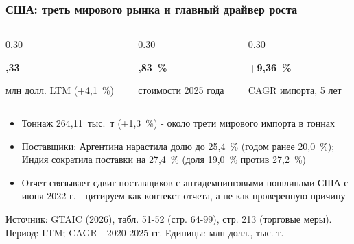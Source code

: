 \documentclass{beamer}
\begin{document}
\begin{frame}[t]
  \frametitle{США: треть мирового рынка и главный драйвер роста}
  \begin{columns}[t]
    \begin{column}{0.30\textwidth}
      {\color{accblue}\bfseries\fontsize{20}{24},33\par}
      {\scriptsize\color{black!60} млн долл. LTM (+4,1~\%)\par}
    \end{column}
    \begin{column}{0.30\textwidth}
      {\color{accblue}\bfseries\fontsize{20}{24},83~\%\par}
      {\scriptsize\color{black!60} стоимости 2025 года\par}
    \end{column}
    \begin{column}{0.30\textwidth}
      {\color{accblue}\bfseries\fontsize{20}{24}\selectfont +9,36~\%\par}
      {\scriptsize\color{black!60} CAGR импорта, 5 лет\par}
    \end{column}
  \end{columns}
  \medskip
  \begin{itemize}
    \item Тоннаж 264,11~тыс.~т (+1,3~\%) - около трети мирового импорта в тоннах
    \item Поставщики: Аргентина нарастила долю до 25,4~\% (годом ранее 20,0~\%); Индия сократила поставки на 27,4~\% (доля 19,0~\% против 27,2~\%)
    \item Отчет связывает сдвиг поставщиков с антидемпинговыми пошлинами США с июня 2022 г. - цитируем как контекст отчета, а не как проверенную причину
  \end{itemize}
  \vfill
  {\scriptsize\color{srcgray} Источник: GTAIC (2026), табл. 51-52 (стр. 64-99), стр. 213 (торговые меры). Период: LTM; CAGR - 2020-2025 гг. Единицы: млн долл., тыс. т.\par}
\end{frame}
\end{document}

